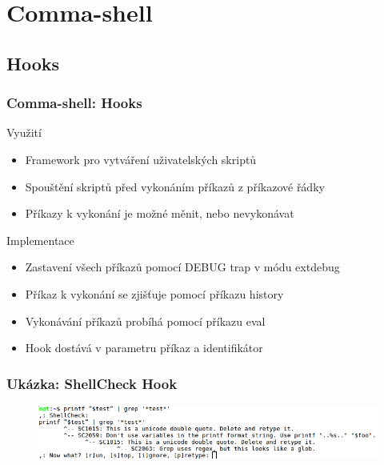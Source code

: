 \documentclass{beamer}
\begin{document}

\section{Comma-shell}


\subsection{Hooks}
\begin{frame}
	\frametitle{Comma-shell: Hooks}
	
	\begin{exampleblock}{Využití}
		\begin{itemize}
			\item Framework pro vytváření uživatelských skriptů
			\item Spouštění skriptů před vykonáním příkazů z příkazové řádky
			\item Příkazy k vykonání je možné měnit, nebo nevykonávat
		\end{itemize}
	\end{exampleblock}	
	
	\begin{exampleblock}{Implementace}
		\begin{itemize}
			\item Zastavení všech příkazů pomocí DEBUG trap v módu extdebug
			\item Příkaz k vykonání se zjišťuje pomocí příkazu history
			\item Vykonávání příkazů probíhá pomocí příkazu eval
			\item Hook dostává v parametru příkaz a identifikátor
		\end{itemize}
	\end{exampleblock}
\end{frame}


\begin{frame}
	\frametitle{Ukázka: ShellCheck Hook}
	\begin{figure}
		\centering
		\includegraphics[width=1.0\textwidth]{./images/shellcheck}
	\end{figure}	
\end{frame}
\end{document}

